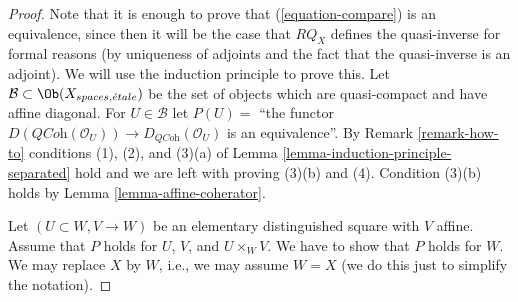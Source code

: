 \begin{proof}
Note that it is enough to prove that (\ref{equation-compare}) is
an equivalence, since then it will be the case that $RQ_X$ defines
the quasi-inverse for formal reasons (by uniqueness of adjoints and
the fact that the quasi-inverse is an adjoint).
We will use the induction principle to prove this. Let
$\mathcal{B} \subset \Ob(X_{spaces, \acute{e}tale})$ be the set of
objects which are quasi-compact and have affine diagonal.
For $U \in \mathcal{B}$ let $P(U) =$ ``the functor
$D(\textit{QCoh}(\mathcal{O}_U)) \to D_{\textit{QCoh}}(\mathcal{O}_U)$
is an equivalence''.
By Remark \ref{remark-how-to} conditions (1), (2), and (3)(a) of
Lemma \ref{lemma-induction-principle-separated} hold and we are
left with proving (3)(b) and (4). Condition (3)(b) holds by
Lemma \ref{lemma-affine-coherator}.

\medskip\noindent
Let $(U \subset W, V \to W)$ be an elementary distinguished square
with $V$ affine. Assume that $P$ holds for $U$, $V$, and $U \times_W V$.
We have to show that $P$ holds for $W$. We may replace $X$ by $W$, i.e.,
we may assume $W = X$ (we do this just to simplify the notation).


\end{proof}
